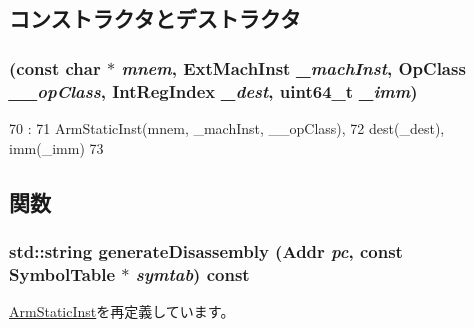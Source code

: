 \subsection{コンストラクタとデストラクタ}
\hypertarget{classArmISA_1_1DataXImmOnlyOp_a69231054b869d3350366c961f9a706e4}{
\subsubsection[{DataXImmOnlyOp}]{ (const char $\ast$ {\em mnem}, \/  {\bf ExtMachInst} {\em \_\-machInst}, \/  OpClass {\em \_\-\_\-opClass}, \/  {\bf IntRegIndex} {\em \_\-dest}, \/  uint64\_\-t {\em \_\-imm})}}
\label{classArmISA_1_1DataXImmOnlyOp_a69231054b869d3350366c961f9a706e4}



\begin{DoxyCode}
70                                                      :
71         ArmStaticInst(mnem, _machInst, __opClass),
72         dest(_dest), imm(_imm)
73     {}

\end{DoxyCode}


\subsection{関数}
\hypertarget{classArmISA_1_1DataXImmOnlyOp_a95d323a22a5f07e14d6b4c9385a91896}{
\subsubsection[{generateDisassembly}]{\setlength{\rightskip}{0pt plus 5cm}std::string generateDisassembly ({\bf Addr} {\em pc}, \/  const SymbolTable $\ast$ {\em symtab}) const}}
\label{classArmISA_1_1DataXImmOnlyOp_a95d323a22a5f07e14d6b4c9385a91896}


\hyperlink{classArmISA_1_1ArmStaticInst_a95d323a22a5f07e14d6b4c9385a91896}{ArmStaticInst}を再定義しています。


